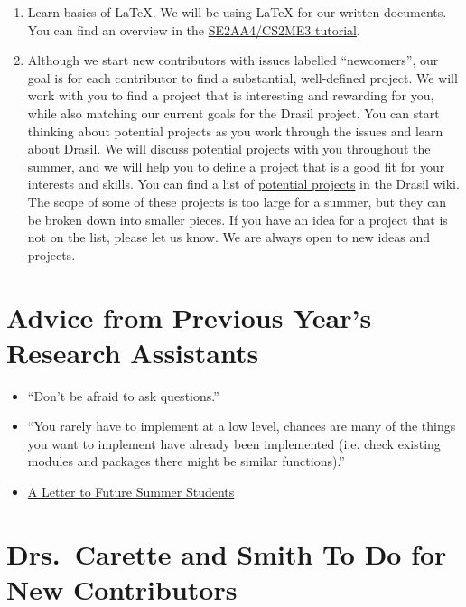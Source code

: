 \documentclass[12pt]{article}
\begin{document}
\begin{enumerate}
\item Learn basics of LaTeX.  We will be using LaTeX for our written documents.
You can find an overview in the
\href{https://gitlab.cas.mcmaster.ca/smiths/se2aa4_cs2me3/-/tree/master/Tutorials/T02a-LaTeX}
{SE2AA4/CS2ME3 tutorial}.

\item Although we start new contributors with issues labelled ``newcomers'', our
goal is for each contributor to find a substantial, well-defined project.  We
will work with you to find a project that is interesting and rewarding for you,
while also matching our current goals for the Drasil project.  You can start
thinking about potential projects as you work through the issues and learn about
Drasil.  We will discuss potential projects with you throughout the summer, and
we will help you to define a project that is a good fit for your interests and
skills.  You can find a list of
\href{https://github.com/JacquesCarette/Drasil/wiki/Potential-Projects}
{potential projects} in the Drasil wiki. The scope of some of these projects is
too large for a summer, but they can be broken down into smaller pieces.  If you
have an idea for a project that is not on the list, please let us know.  We are
always open to new ideas and projects.

\end{enumerate}

\section{Advice from Previous Year's Research Assistants} \label{SecAdvice}

\begin{itemize}

\item ``Don't be afraid to ask questions.''

\item ``You rarely have to implement at a low level, chances are many of the
things you want to implement have already been implemented (i.e. check existing
modules and packages there might be similar functions).''

\item
\href{https://github.com/JacquesCarette/Drasil/wiki/Letter-to-Summer-Students}
{A Letter to Future Summer Students}

\end{itemize}

\section{Drs.\ Carette and Smith To Do for New Contributors} \label{SecToDo}
\end{document}
